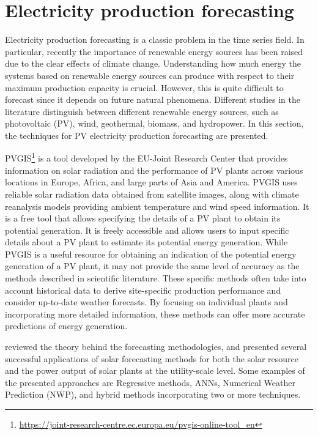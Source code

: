 \section{Electricity production forecasting}
\label{sec:productionsoa}
\vspace{0.2 cm}

Electricity production forecasting is a classic problem in the time series field.
In particular, recently the importance of renewable energy sources has been raised due to the clear effects of climate change.
Understanding how much energy the systems based on renewable energy sources can produce with respect to their maximum production capacity is crucial.
However, this is quite difficult to forecast since it depends on future natural phenomena.
Different studies in the literature distinguish between different renewable energy sources, such as photovoltaic (PV), wind, geothermal, biomass, and hydropower.
In this section, the techniques for PV electricity production forecasting are presented.

PVGIS\footnote{ \url{https://joint-research-centre.ec.europa.eu/pvgis-online-tool_en} } is a tool developed by the EU-Joint Research Center that provides information on solar radiation and the performance of PV plants across various locations in Europe, Africa, and large parts of Asia and America.
PVGIS uses reliable solar radiation data obtained from satellite images, along with climate reanalysis models providing ambient temperature and wind speed information.
It is a free tool that allows specifying the details of a PV plant to obtain its potential generation.
It is freely accessible and allows users to input specific details about a PV plant to estimate its potential energy generation.
While PVGIS is a useful resource for obtaining an indication of the potential energy generation of a PV plant, it may not provide the same level of accuracy as the methods described in scientific literature.
These specific methods often take into account historical data to derive site-specific production performance and consider up-to-date weather forecasts.
By focusing on individual plants and incorporating more detailed information, these methods can offer more accurate predictions of energy generation.

\cite{INMAN2013535} reviewed the theory behind the forecasting methodologies, and presented several successful applications of solar forecasting methods for both the solar resource and the power output of solar plants at the utility-scale level.
Some examples of the presented approaches are Regressive methods, ANNs, Numerical Weather Prediction (NWP), and hybrid methods incorporating two or more techniques.

